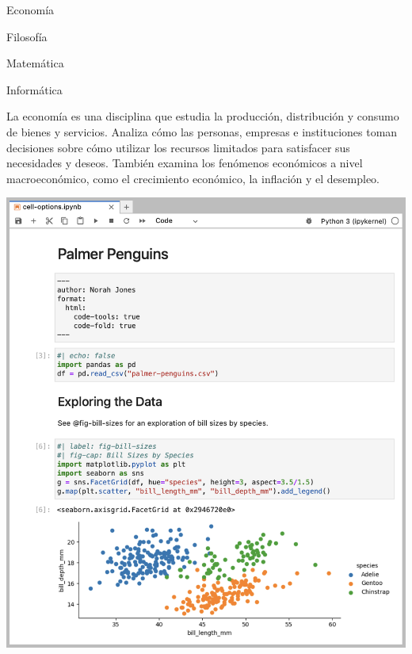 \documentclass[
  letterpaper,
]{article}
\begin{document}
Economía

Filosofía

Matemática

Informática

\hypertarget{hello-quarto-tabcontent}{}
\leavevmode{}%
La economía es una disciplina que estudia la producción, distribución y
consumo de bienes y servicios. Analiza cómo las personas, empresas e
instituciones toman decisiones sobre cómo utilizar los recursos
limitados para satisfacer sus necesidades y deseos. También examina los
fenómenos económicos a nivel macroeconómico, como el crecimiento
económico, la inflación y el desempleo.

\includegraphics{images/demo-jupyter-plain.png}
\end{document}
